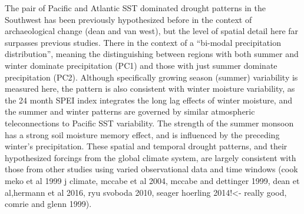 \documentclass[11pt]{wlscirep}
\begin{document}
The pair of Pacific and Atlantic SST dominated drought patterns in the Southwest has been previously hypothesized before in the context of archaeological change (dean and van west), but the level of spatial detail here far surpasses previous studies. There in the context of a ``bi-modal precipitation distribution'', meaning the distinguishing between regions with both summer and winter dominate precipitation (PC1) and those with just summer dominate precipitation (PC2). Although specifically growing season (summer) variability is measured here, the pattern is also consistent with winter moisture variability, as the 24 month SPEI index integrates the long lag effects of winter moisture, and the summer and winter patterns are governed by similar atmospheric teleconnections to Pacific SST variability. The strength of the summer monsoon has a strong soil moisture memory effect, and is influenced by the preceding winter's precipitation. These spatial and temporal drought patterns, and their hypothesized forcings from the global climate system, are largely consistent with those from other studies using varied observational data and time windows (cook meko et al 1999 j climate, mccabe et al 2004, mccabe and dettinger 1999, dean et al,hermann et al 2016, ryu svoboda 2010, seager hoerling 2014!<- really good, comrie and glenn 1999).
\end{document}
